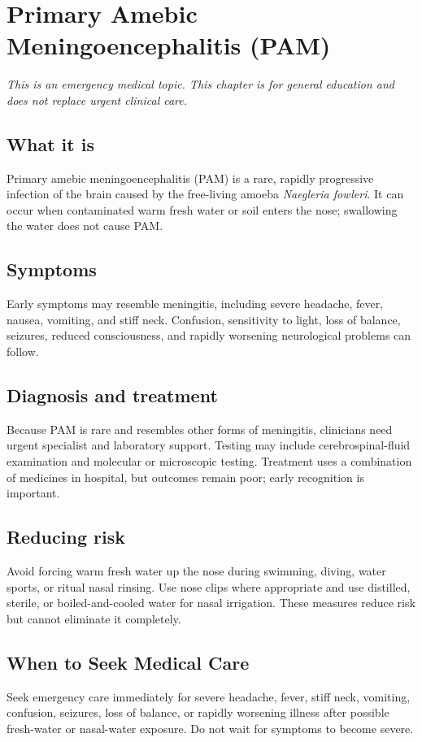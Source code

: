 \chapter{Primary Amebic Meningoencephalitis (PAM)}

\medskip
\noindent\textit{This is an emergency medical topic. This chapter is for general education and does not replace urgent clinical care.}

\section*{What it is}
Primary amebic meningoencephalitis (PAM) is a rare, rapidly progressive infection of the brain caused by the free-living amoeba \textit{Naegleria fowleri}. It can occur when contaminated warm fresh water or soil enters the nose; swallowing the water does not cause PAM.

\section*{Symptoms}
Early symptoms may resemble meningitis, including severe headache, fever, nausea, vomiting, and stiff neck. Confusion, sensitivity to light, loss of balance, seizures, reduced consciousness, and rapidly worsening neurological problems can follow.

\section*{Diagnosis and treatment}
Because PAM is rare and resembles other forms of meningitis, clinicians need urgent specialist and laboratory support. Testing may include cerebrospinal-fluid examination and molecular or microscopic testing. Treatment uses a combination of medicines in hospital, but outcomes remain poor; early recognition is important.

\section*{Reducing risk}
Avoid forcing warm fresh water up the nose during swimming, diving, water sports, or ritual nasal rinsing. Use nose clips where appropriate and use distilled, sterile, or boiled-and-cooled water for nasal irrigation. These measures reduce risk but cannot eliminate it completely.

\section*{When to Seek Medical Care}
Seek emergency care immediately for severe headache, fever, stiff neck, vomiting, confusion, seizures, loss of balance, or rapidly worsening illness after possible fresh-water or nasal-water exposure. Do not wait for symptoms to become severe.

